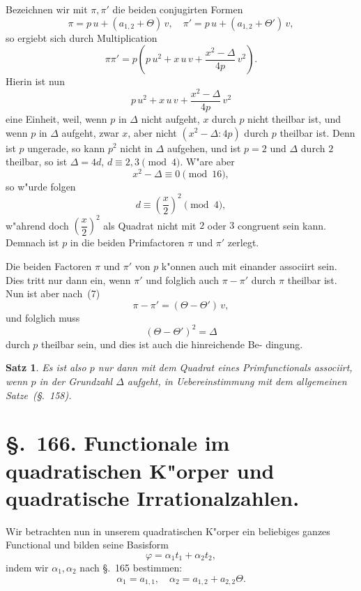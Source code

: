 \documentclass[12pt,a4paper]{article}
\theoremstyle{weber}
\newtheorem*{satz}{Satz}
\begin{document}
Bezeichnen wir mit $\pi, \pi'$ die beiden conjugirten Formen
\begin{equation}\label{eq:s165-7}
\pi = p\,u + (a_{1,2} + \varTheta)\,v, \quad \pi' = p\,u + (a_{1,2} + \varTheta')\,v,
\end{equation}
so ergiebt sich durch Multiplication
\begin{equation}\label{eq:s165-8}
\pi\pi' = p\left(p\,u^2 + x\,u\,v + \frac{x^2 - \varDelta}{4p}\,v^2\right).
\end{equation}
Hierin ist nun
\[
p\,u^2 + x\,u\,v + \frac{x^2 - \varDelta}{4p}\,v^2
\]
eine Einheit, weil, wenn $p$ in $\varDelta$ nicht aufgeht, $x$ durch $p$ nicht
theilbar ist, und wenn $p$ in $\varDelta$ aufgeht, zwar $x$, aber nicht
$(x^2 - \varDelta : 4p)$ durch $p$ theilbar ist. Denn ist $p$ ungerade, so kann
$p^2$ nicht in $\varDelta$ aufgehen, und ist $p = 2$ und $\varDelta$ durch $2$ theilbar,
so ist $\varDelta = 4d$, $d \equiv 2, 3 \pmod{4}$. W"are aber
\[
x^2 - \varDelta \equiv 0 \pmod{16},
\]
so w"urde folgen
\[
d \equiv \left(\frac{x}{2}\right)^2 \pmod{4},
\]
w"ahrend doch $\left(\dfrac{x}{2}\right)^2$ als Quadrat nicht mit $2$ oder $3$ congruent
sein kann. Demnach ist $p$ in die beiden Primfactoren $\pi$ und $\pi'$
zerlegt.

Die beiden Factoren $\pi$ und $\pi'$ von $p$ k"onnen auch mit
einander associirt sein. Dies tritt nur dann ein, wenn $\pi'$ und
folglich auch $\pi - \pi'$ durch $\pi$ theilbar ist. Nun ist aber nach~(7)
\[
\pi - \pi' = (\varTheta - \varTheta')\,v,
\]
und folglich muss
\[
(\varTheta - \varTheta')^2 = \varDelta
\]
durch $p$ theilbar sein, und dies ist auch die hinreichende Be-
dingung.

\begin{satz}
Es ist also $p$ nur dann mit dem Quadrat eines
Primfunctionals associirt, wenn $p$ in der Grundzahl
$\varDelta$ aufgeht, in Uebereinstimmung mit dem
allgemeinen Satze~(\S.~158).
\end{satz}

\newpage
\section*{\S.~166. Functionale im quadratischen K"orper und quadratische Irrationalzahlen.}

Wir betrachten nun in unserem quadratischen K"orper ein
beliebiges ganzes Functional und bilden seine Basisform
\[
\varphi = \alpha_1t_1 + \alpha_2t_2,
\]
indem wir $\alpha_1, \alpha_2$ nach \S.~165 bestimmen:
\begin{equation}\label{eq:s166-1}
\alpha_1 = a_{1,1}, \quad \alpha_2 = a_{1,2} + a_{2,2}\varTheta.
\end{equation}
\end{document}
